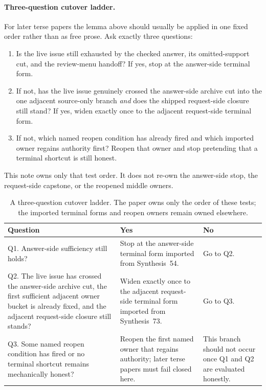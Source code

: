 \documentclass[11pt]{article}
\begin{document}
\paragraph{Three-question cutover ladder.}
For later terse papers the lemma above should usually be applied in one fixed order rather than as free prose.
Ask exactly three questions:
\begin{enumerate}[leftmargin=2em]
    \item Is the live issue still exhausted by the checked answer, its omitted-support cut, and the review-menu handoff? If yes, stop at the answer-side terminal form.
    \item If not, has the live issue genuinely crossed the answer-side archive cut into the one adjacent source-only branch \emph{and} does the shipped request-side closure still stand? If yes, widen exactly once to the adjacent request-side terminal form.
    \item If not, which named reopen condition has already fired and which imported owner regains authority first? Reopen that owner and stop pretending that a terminal shortcut is still honest.
\end{enumerate}
This note owns only that test order.
It does not re-own the answer-side stop, the request-side capstone, or the reopened middle owners.

\begin{table}[t]
\centering
\small
\begin{tabularx}{\linewidth}{@{}L Y Y@{}}
\toprule
Question & Yes & No \\
\midrule
Q1. Answer-side sufficiency still holds? & Stop at the answer-side terminal form imported from Synthesis~54. & Go to Q2. \\
Q2. The live issue has crossed the answer-side archive cut, the first sufficient adjacent owner bucket is already fixed, and the adjacent request-side closure still stands? & Widen exactly once to the adjacent request-side terminal form imported from Synthesis~73. & Go to Q3. \\
Q3. Some named reopen condition has fired or no terminal shortcut remains mechanically honest? & Reopen the first named owner that regains authority; later terse papers must fail closed here. & This branch should not occur once Q1 and Q2 are evaluated honestly. \\
\bottomrule
\end{tabularx}
\caption{A three-question cutover ladder. The paper owns only the order of these tests; the imported terminal forms and reopen owners remain owned elsewhere.}
\label{tab:three-question-cutover-ladder}
\end{table}
\end{document}
